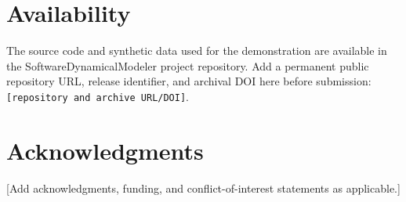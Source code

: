 \documentclass[11pt]{article}
\begin{document}
\section*{Availability}

The source code and synthetic data used for the demonstration are available in the SoftwareDynamicalModeler project repository. Add a permanent public repository URL, release identifier, and archival DOI here before submission: \texttt{[repository and archive URL/DOI]}.

\section*{Acknowledgments}

[Add acknowledgments, funding, and conflict-of-interest statements as applicable.]



\end{document}
